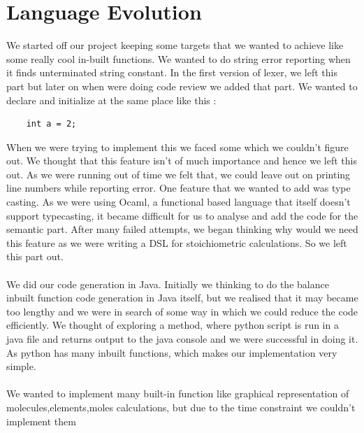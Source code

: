 \documentclass[english,a4paper,12pt]{report}
\begin{document}
\chapter{Language Evolution}
We started off our project keeping some targets that we wanted to achieve like some really cool in-built functions. We wanted to do string error reporting when it finds unterminated string constant. In the first version of lexer, we left this part but later on when were doing code review we added that part. We wanted to declare and initialize at the same place like this :
\begin{verbatim}
    int a = 2;
\end{verbatim}
When we were trying to implement this we faced some which we couldn't figure out. We thought that this feature isn't of much importance and hence we left this out. 
As we were running out of time we felt that, we could leave out on printing line numbers while reporting error. One feature that we wanted to add was type casting. As we were using Ocaml, a functional based language that itself doesn't support typecasting, it became difficult for us to analyse and add the code for the semantic part. After many failed attempts, we began thinking why would we need this feature as we were writing a DSL for stoichiometric calculations. So we left this part out. 
\\\\
We did our code generation in Java. Initially we thinking to do the balance inbuilt function code generation in Java itself, but we realised that it may became too lengthy and we were in search of some way in which we could reduce the code efficiently. We thought of exploring a method, where python script is run in a java file and returns output to the java console and we were successful in doing it. As python has many inbuilt functions, which makes our implementation very simple.
\\\\
We wanted to implement many built-in function like graphical representation of molecules,elements,moles calculations, but due to the time constraint we couldn't implement them 
\end{document}
